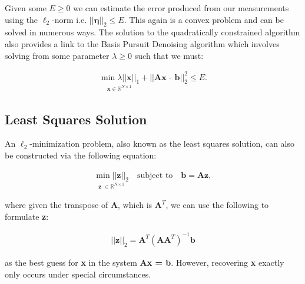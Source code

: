 \documentclass[titlepage,oneside, 12pt]{book}
\theoremstyle{break}
\begin{document}
Given some $E \ge 0$ we can estimate the error produced from our measurements using the $\ell_2$-norm i.e. $||\pmb{\eta}||_2 \le E$. This again is a convex problem and can be solved in numerous ways. The solution to the quadratically constrained algorithm also provides a link to the Basis Pursuit Denoising algorithm which involves solving from some parameter $\lambda \ge 0$ such that we must:\cite{BookMICS}

\begin{equation}
\begin{gathered}
\underset{\textbf{x} \in \mathbb{R}^{N \times 1}}{\min \lambda||\textbf{x}||_{1}} + ||\textbf{Ax - b}||_{2}^{2} \le E.
\end{gathered}
\end{equation}


\newpage

\subsection{Least Squares Solution}
An  $\ell_{2}$-minimization problem, also known as the least squares solution, can also be constructed via the following equation:

\begin{equation}
\begin{gathered}
\underset{\textbf{z }\in \mathbb{R}^{N \times 1}}{\min ||\textbf{z}||_{2}} \quad \text{subject to} \quad \textbf{b} = \textbf{Az},
\end{gathered}
\label{eqn:l2-1}
\end{equation}

where given the transpose of \textbf{A}, which is $\textbf{A}^{T}$, we can use the following to formulate \textbf{z}:

\begin{equation}
\begin{gathered}
||\textbf{z}||_{2} = \textbf{A}^{T}(\textbf{A}\textbf{A}^{T})^{-1}\textbf{b} 
\end{gathered}
\label{eqn:l2-2}
\end{equation}

as the best guess for \textbf{x} in the system \textbf{Ax = b}. 
However, recovering \textbf{x} exactly only occurs under special circumstances. 
\end{document}

